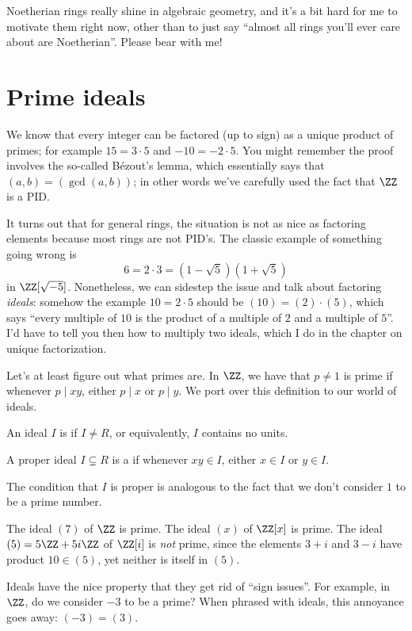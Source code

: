Noetherian rings really shine in algebraic geometry,
and it's a bit hard for me to motivate them right now,
other than to just say ``almost all rings you'll ever care about are Noetherian''.
Please bear with me!

\section{Prime ideals}
We know that every integer can be factored (up to sign)
as a unique product of primes; for example $15 = 3 \cdot 5$
and $-10 = -2 \cdot 5$.
You might remember the proof involves the so-called B\'ezout's lemma,
which essentially says that $(a,b) = (\gcd(a,b))$;
in other words we've carefully used the fact that $\ZZ$ is a PID.

It turns out that for general rings, the situation is not as nice
as factoring elements because most rings are not PID's.
The classic example of something going wrong is
\[ 6 = 2 \cdot 3 = \left( 1-\sqrt5 \right)\left( 1+\sqrt5 \right) \]
in $\ZZ[\sqrt{-5}]$.
Nonetheless, we can sidestep the issue
and talk about factoring \emph{ideals}:
somehow the example $10 = 2 \cdot 5$ should be $(10) = (2) \cdot (5)$,
which says ``every multiple of $10$ is the product of a
multiple of $2$ and a multiple of $5$''.
I'd have to tell you then how to multiply two ideals, which I do
in the chapter on unique factorization.

Let's at least figure out what primes are.
In $\ZZ$, we have that $p \neq 1$ is prime if whenever $p \mid xy$,
either $p \mid x$ or $p \mid y$.
We port over this definition to our world of ideals.
\begin{definition}
	An ideal $I$ is  if $I \neq R$,
	or equivalently, $I$ contains no units.
\end{definition}
\begin{definition}
	A proper ideal $I \subsetneq R$ is a 
	if whenever $xy \in I$, either $x \in I$ or $y \in I$.
\end{definition}
The condition that $I$ is proper is analogous to the
fact that we don't consider $1$ to be a prime number.

\begin{example}
	\listhack
	\begin{enumerate}[(a)]
		\ii The ideal $(7)$ of $\ZZ$ is prime.
		\ii The ideal $(x)$ of $\ZZ[x]$ is prime.
		\ii The ideal $(5) = 5\ZZ + 5i\ZZ$ of $\ZZ[i]$ is \emph{not} prime, since
		the elements $3+i$ and $3-i$ have product $10 \in (5)$,
		yet neither is itself in $(5)$.
	\end{enumerate}
\end{example}
\begin{remark}
	Ideals have the nice property that they get rid of ``sign issues''.
	For example, in $\ZZ$, do we consider $-3$ to be a prime?
	When phrased with ideals, this annoyance goes away: $(-3) = (3)$.
\end{remark}

